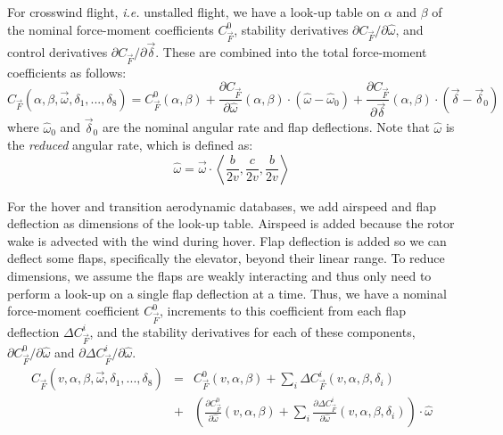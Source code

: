 \documentclass[11pt]{amsart}
\begin{document}
For crosswind flight, {\it i.e.} unstalled flight, we
have a look-up table on $\alpha$ and $\beta$ of the nominal
force-moment coefficients $C_{\vec{F}}^0$, stability derivatives
$\partial C_{\vec{F}}/\partial \hat{\omega}$, and control
derivatives $\partial C_{\vec{F}}/\partial \vec{\delta}$.
These are combined into the total force-moment coefficients as
follows:
\begin{equation}
\label{eqn:force-moment-derivative}
C_{\vec{F}}(\alpha, \beta, \vec{\omega}, \delta_1, ..., \delta_8)
=
C^0_{\vec{F}}(\alpha, \beta) +
\frac{\partial C_{\vec{F}}}{\partial \hat{\omega}}(\alpha, \beta)
\cdot (\hat{\omega} - \hat{\omega}_0) +
\frac{\partial C_{\vec{F}}}{\partial \vec{\delta}}(\alpha, \beta)
\cdot (\vec{\delta} - \vec{\delta}_0)
\end{equation}
where $\hat{\omega}_0$ and $\vec{\delta}_0$ are the nominal angular
rate and flap deflections.  Note that $\hat{\omega}$ is the {\it
  reduced} angular rate, which is defined as:
\begin{equation}
  \hat{\omega} = \vec{\omega} \cdot
\left<\frac{b}{2 v}, \frac{c}{2 v}, \frac{b}{2 v}\right>
\end{equation}

For the hover and transition aerodynamic databases, we add airspeed
and flap deflection as dimensions of the look-up table.  Airspeed is
added because the rotor wake is advected with the wind during hover.
Flap deflection is added so we can deflect some flaps, specifically
the elevator, beyond their linear range.  To reduce dimensions, we
assume the flaps are weakly interacting and thus only need to perform
a look-up on a single flap deflection at a time.  Thus, we have a
nominal force-moment coefficient $C^0_{\vec{F}}$, increments to this
coefficient from each flap deflection $\Delta C^i_{\vec{F}}$, and the
stability derivatives for each of these components, $\partial
C^0_{\vec{F}}/\partial \hat{\omega}$ and $\partial \Delta
C^i_{\vec{F}}/\partial \hat{\omega}$.
\begin{eqnarray}
\label{eqn:dvl-model}
C_{\vec{F}}(v, \alpha, \beta, \vec{\omega}, \delta_1, ..., \delta_8) &=&
C^0_{\vec{F}}(v, \alpha, \beta) +
\sum_i \Delta C^i_{\vec{F}}(v, \alpha, \beta, \delta_i) \\
&+& \left(
\frac{\partial C^0_{\vec{F}}}{\partial \hat{\omega}}(v, \alpha, \beta) +
\sum_i \frac{\partial \Delta C^i_{\vec{F}}}{\partial \hat{\omega}}(v, \alpha, \beta, \delta_i)
\right) \cdot \hat{\omega}
\end{eqnarray}
\end{document}
